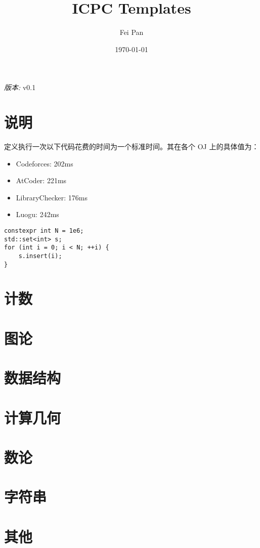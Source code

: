 \documentclass[12pt]{ctexart}
\title{ICPC Templates}
\date{\today}
\author{Fei Pan}
\newcommand{\version}{v0.1}
\begin{document}
\maketitle
\thispagestyle{empty}
\begin{center}
    \textit{版本: }\version
\end{center}

\tableofcontents
\newpage

\section{说明}

定义执行一次以下代码花费的时间为一个标准时间。其在各个 OJ 上的具体值为：

\begin{itemize}
\item Codeforces: 202ms
\item AtCoder: 221ms
\item LibraryChecker: 176ms
\item Luogu: 242ms
\end{itemize}
\begin{lstlisting}
constexpr int N = 1e6;
std::set<int> s;
for (int i = 0; i < N; ++i) {
    s.insert(i);
}
\end{lstlisting}
\newpage

\section{计数}



\section{图论}






\section{数据结构}


\section{计算几何}




\section{数论}





\section{字符串}




\section{其他}


\end{document}

